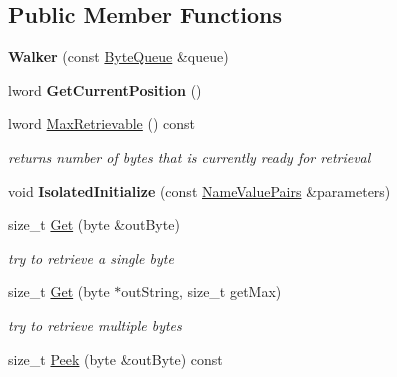\subsection*{Public Member Functions}
\begin{DoxyCompactItemize}
\item 
\hypertarget{class_byte_queue_1_1_walker_a6690a4529e61498d2abc68f4fe07b01c}{
{\bfseries Walker} (const \hyperlink{class_byte_queue}{ByteQueue} \&queue)}
\label{class_byte_queue_1_1_walker_a6690a4529e61498d2abc68f4fe07b01c}

\item 
\hypertarget{class_byte_queue_1_1_walker_a4ea60c7d732acbf91e4fb2b3bc3abaad}{
lword {\bfseries GetCurrentPosition} ()}
\label{class_byte_queue_1_1_walker_a4ea60c7d732acbf91e4fb2b3bc3abaad}

\item 
lword \hyperlink{class_byte_queue_1_1_walker_a3c69dce9261b937f265bae9e8c26479f}{MaxRetrievable} () const 
\begin{DoxyCompactList}\small\item\em returns number of bytes that is currently ready for retrieval \item\end{DoxyCompactList}\item 
\hypertarget{class_byte_queue_1_1_walker_ab74b6b33c01b0221a24e1ba17ac7a374}{
void {\bfseries IsolatedInitialize} (const \hyperlink{class_name_value_pairs}{NameValuePairs} \&parameters)}
\label{class_byte_queue_1_1_walker_ab74b6b33c01b0221a24e1ba17ac7a374}

\item 
\hypertarget{class_byte_queue_1_1_walker_a1577996016d4fc5e644b86eb1a4f1660}{
size\_\-t \hyperlink{class_byte_queue_1_1_walker_a1577996016d4fc5e644b86eb1a4f1660}{Get} (byte \&outByte)}
\label{class_byte_queue_1_1_walker_a1577996016d4fc5e644b86eb1a4f1660}

\begin{DoxyCompactList}\small\item\em try to retrieve a single byte \item\end{DoxyCompactList}\item 
\hypertarget{class_byte_queue_1_1_walker_a940623c7bff90ab48f1534352675f92b}{
size\_\-t \hyperlink{class_byte_queue_1_1_walker_a940623c7bff90ab48f1534352675f92b}{Get} (byte $\ast$outString, size\_\-t getMax)}
\label{class_byte_queue_1_1_walker_a940623c7bff90ab48f1534352675f92b}

\begin{DoxyCompactList}\small\item\em try to retrieve multiple bytes \item\end{DoxyCompactList}\item 
\hypertarget{class_byte_queue_1_1_walker_af2c8cbc9323d5844d3080fd29e7cf308}{
size\_\-t \hyperlink{class_byte_queue_1_1_walker_af2c8cbc9323d5844d3080fd29e7cf308}{Peek} (byte \&outByte) const }
\label{class_byte_queue_1_1_walker_af2c8cbc9323d5844d3080fd29e7cf308}


\end{DoxyCompactItemize}
